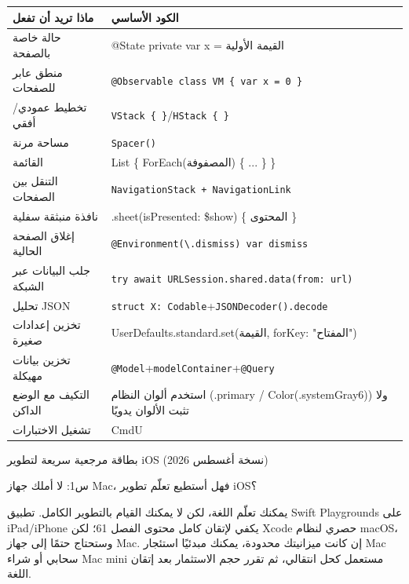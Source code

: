 


\begin{center}
\begin{tabularx}{\linewidth}{|X|X|}
\hline
\textbf{ماذا تريد أن تفعل} & \textbf{الكود الأساسي} \tabularnewline
\hline
حالة خاصة بالصفحة & @State private var x = القيمة الأولية \tabularnewline
منطق عابر للصفحات & \texttt{@Observable class VM \{ var x = 0 \}} \tabularnewline
تخطيط عمودي/أفقي & \texttt{VStack \{ \}}/\texttt{HStack \{ \}} \tabularnewline
مساحة مرنة & \texttt{Spacer()} \tabularnewline
القائمة & List \{ ForEach(المصفوفة) \{ ... \} \} \tabularnewline
التنقل بين الصفحات & \texttt{NavigationStack + NavigationLink} \tabularnewline
نافذة منبثقة سفلية & .sheet(isPresented: \$show) \{ المحتوى \} \tabularnewline
إغلاق الصفحة الحالية & \texttt{@Environment(\textbackslash{}.\allowbreak dismiss) var dismiss} \tabularnewline
جلب البيانات عبر الشبكة & \texttt{try await URLSession.\allowbreak shared.\allowbreak data(from: url)} \tabularnewline
تحليل JSON & \texttt{struct X: Codable}+\texttt{JSONDecoder().\allowbreak decode} \tabularnewline
تخزين إعدادات صغيرة & UserDefaults.standard.set(القيمة, forKey: "المفتاح") \tabularnewline
تخزين بيانات مهيكلة & \texttt{@Model}+\texttt{modelContainer}+\texttt{@Query} \tabularnewline
التكيف مع الوضع الداكن & استخدم ألوان النظام (.primary / Color(.systemGray6)) ولا تثبت الألوان يدويًا \tabularnewline
تشغيل الاختبارات & CmdU \tabularnewline
\hline
\end{tabularx}
\end{center}

\begin{center}\small\color{gray}بطاقة مرجعية سريعة لتطوير iOS (نسخة أغسطس 2026)\end{center}


س1: لا أملك جهاز Mac، فهل أستطيع تعلّم تطوير iOS؟

يمكنك تعلّم اللغة، لكن لا يمكنك القيام بالتطوير الكامل. تطبيق Swift Playgrounds على iPad/iPhone يكفي لإتقان كامل محتوى الفصل 61؛ لكن Xcode حصري لنظام macOS، وستحتاج حتمًا إلى جهاز Mac. إن كانت ميزانيتك محدودة، يمكنك مبدئيًا استئجار Mac سحابي أو شراء Mac mini مستعمل كحل انتقالي، ثم تقرر حجم الاستثمار بعد إتقان اللغة.

